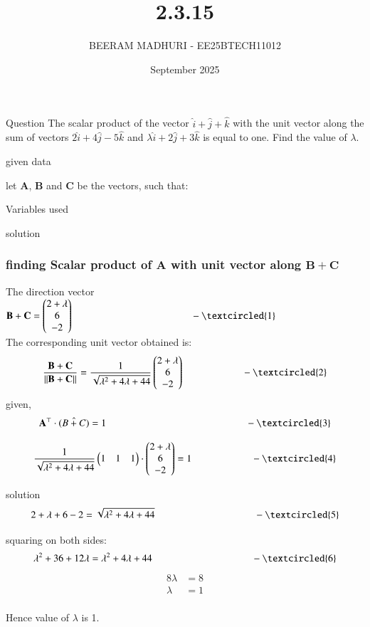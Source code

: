 \documentclass{beamer}
\title %
{2.3.15}
\date{September  2025}
\author %
{BEERAM MADHURI - EE25BTECH11012}
\begin{document}
\frame{\titlepage}
\begin{frame}{Question}
The scalar product of the vector $\hat{i}+\hat{j}+\hat{k}$ with the unit vector along the sum of vectors $2\hat{i} + 4\hat{j} - 5\hat{k}$ and $\lambda \hat{i} + 2\hat{j} + 3\hat{k}$ is equal to one. Find the value of $\lambda$.
 
\end{frame}
 
\begin{frame}{given data}
 
\text let $\mathbf{A}$, $\mathbf{B}$ and $\mathbf{C}$ be the vectors, such that:
\begin{table}[h!]
    \centering
    
    \caption{Variables used}
    \label{table 2.3.15}
\end{table}


   
\end{frame}
 
\begin{frame}{solution}
    \frametitle{finding Scalar product of $\mathbf{A}$ with unit vector along  $\mathbf{B}+\mathbf{C}$}
The direction vector $\mathbf{B}+\mathbf{C} = \begin{pmatrix} 2+\lambda \\ 6 \\ -2 \end{pmatrix} \qquad  \qquad  \qquad   \qquad \qquad \qquad -\textcircled{1}$ \\

The corresponding unit vector obtained is:
\[\frac{\vec{B} + \vec{C}}{\|\vec{B} + \vec{C}\|} =
\frac{1}{\sqrt{\lambda^2 + 4\lambda + 44}} \begin{pmatrix} 2+\lambda \\ 6 \\ -2 \end{pmatrix}  \qquad \qquad \qquad -\textcircled{2}\]
given,
\[ \mathbf{A^\top} \cdot (\hat{B+C}) = 1  \qquad  \qquad  \qquad \qquad \qquad \qquad \qquad -\textcircled{3}\]

\[\frac{1}{\sqrt{\lambda^2 + 4\lambda + 44}} \begin{pmatrix}1 & 1 & 1 \end{pmatrix} \cdot \begin{pmatrix} 2+\lambda \\ 6 \\ -2 \end{pmatrix} = 1  \qquad \qquad \qquad-\textcircled{4}\]
\end{frame}
\begin{frame}{solution}
\[2 + \lambda + 6 - 2 = \sqrt{\lambda^2 + 4\lambda + 44} \qquad \qquad   \qquad \qquad \qquad -\textcircled{5}\]

squaring on both sides:
\[\lambda^2 + 36 + 12\lambda = \lambda^2 + 4\lambda + 44  \qquad  \qquad \qquad \qquad \qquad -\textcircled{6}\] 
\[\begin{aligned}8\lambda &= 8 \\\lambda &= 1\end{aligned}\]\\
Hence value of $\lambda$ is 1.
\end{frame}
\end{document}

